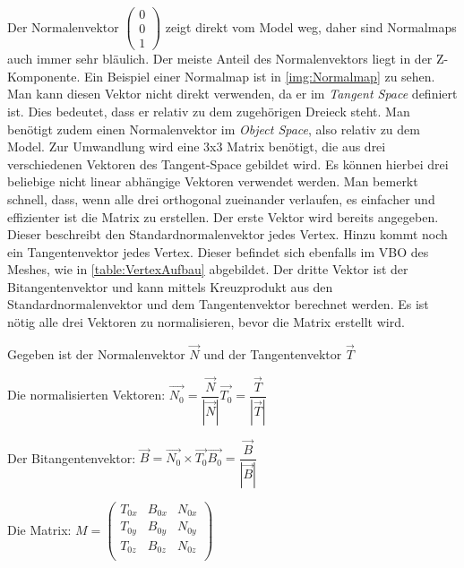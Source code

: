 Der Normalenvektor $\begin{pmatrix}
	0 \\ 0 \\ 1
\end{pmatrix}$ zeigt direkt vom Model weg, daher sind Normalmaps auch immer sehr bläulich. Der meiste Anteil des Normalenvektors liegt in der Z-Komponente. Ein Beispiel einer Normalmap ist in \cref{img:Normalmap} zu sehen. Man kann diesen Vektor nicht direkt verwenden, da er im \textit{Tangent Space} definiert ist. 
Dies bedeutet, dass er relativ zu dem zugehörigen Dreieck steht.
Man benötigt zudem einen Normalenvektor im \textit{Object Space}, also relativ zu dem Model. 
Zur Umwandlung wird eine 3x3 Matrix benötigt, die aus drei verschiedenen Vektoren des Tangent-Space gebildet wird. 
Es können hierbei drei beliebige nicht linear abhängige Vektoren verwendet werden. Man bemerkt schnell, dass, wenn alle drei orthogonal zueinander verlaufen, es einfacher und effizienter ist die Matrix zu erstellen. 
Der erste Vektor wird bereits angegeben. 
Dieser beschreibt den Standardnormalenvektor jedes Vertex. Hinzu kommt noch ein Tangentenvektor jedes Vertex. Dieser befindet sich ebenfalls im \ac{VBO} des Meshes, wie in \cref{table:VertexAufbau} abgebildet. Der dritte Vektor ist der Bitangentenvektor und kann mittels Kreuzprodukt aus den Standardnormalenvektor und dem Tangentenvektor  berechnet werden. Es ist nötig alle drei Vektoren zu normalisieren, bevor die Matrix erstellt wird.

Gegeben ist der Normalenvektor $\overrightarrow{N}$ und der Tangentenvektor $\overrightarrow{T}$

Die normalisierten Vektoren: $\overrightarrow{N_{0}} = \dfrac{\overrightarrow{N}}{|\overrightarrow{N}|}$\qquad	$\overrightarrow{T_{0}} = \dfrac{\overrightarrow{T}}{|\overrightarrow{T}|}$

Der Bitangentenvektor: $\overrightarrow{B} = \overrightarrow{N_{0}} \times \overrightarrow{T_{0}}$\qquad	$\overrightarrow{B_{0}} = \dfrac{\overrightarrow{B}}{|\overrightarrow{B}|}$

Die Matrix: $M =  \begin{pmatrix}
T_{0x} & B_{0x} & N_{0x} \\
T_{0y} & B_{0y} & N_{0y} \\
T_{0z} & B_{0z} & N_{0z} \\
\end{pmatrix}$

